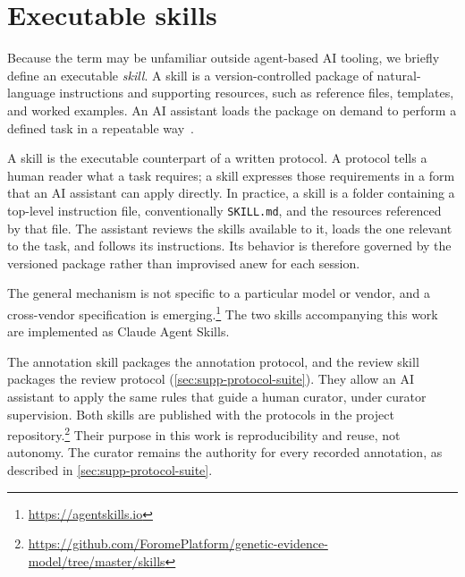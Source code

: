 
\section{Executable skills}
\label{sec:supp-skills}

Because the term may be unfamiliar outside agent-based AI tooling, we briefly
define an executable \emph{skill}. A skill is a version-controlled package of
natural-language instructions and supporting resources, such as reference
files, templates, and worked examples. An AI assistant loads the package on
demand to perform a defined task in a repeatable way~\cite{anthropic_skills}.

A skill is the executable counterpart of a written protocol. A protocol tells
a human reader what a task requires; a skill expresses those requirements in a
form that an AI assistant can apply directly. In practice, a skill is a
folder containing a top-level instruction file, conventionally
\texttt{SKILL.md}, and the resources referenced by that file. The assistant
reviews the skills available to it, loads the one relevant to the task, and
follows its instructions. Its behavior is therefore governed by the
versioned package rather than improvised anew for each session.

The general mechanism is not specific to a particular model or vendor, and a
cross-vendor specification is emerging.\footnote{\url{https://agentskills.io}}
The two skills accompanying this work are implemented as Claude Agent Skills.

The annotation skill packages the annotation protocol, and the review skill
packages the review protocol (\cref{sec:supp-protocol-suite}). They allow an
AI assistant to apply the same rules that guide a human curator, under curator
supervision. Both skills are published with the protocols in the project
repository.\footnote{\url{https://github.com/ForomePlatform/genetic-evidence-model/tree/master/skills}}
Their purpose in this work is reproducibility and reuse, not autonomy. The
curator remains the authority for every recorded annotation, as described in
\cref{sec:supp-protocol-suite}.
